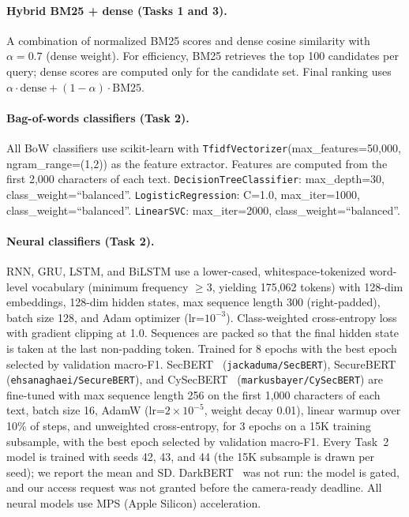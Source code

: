\documentclass{article}
\begin{document}
\paragraph{Hybrid BM25 + dense (Tasks 1 and 3).}
A combination of normalized BM25 scores and dense cosine similarity with $\alpha{=}0.7$ (dense weight). For efficiency, BM25 retrieves the top 100 candidates per query; dense scores are computed only for the candidate set. Final ranking uses $\alpha \cdot \text{dense} + (1{-}\alpha) \cdot \text{BM25}$.

\paragraph{Bag-of-words classifiers (Task 2).}
All BoW classifiers use scikit-learn with \texttt{TfidfVectorizer}(max\_features=50{,}000, ngram\_range=(1,2)) as the feature extractor. Features are computed from the first 2{,}000 characters of each text. \texttt{DecisionTreeClassifier}: max\_depth=30, class\_weight=``balanced''. \texttt{LogisticRegression}: C=1.0, max\_iter=1000, class\_weight=``balanced''. \texttt{LinearSVC}: max\_iter=2000, class\_weight=``balanced''.

\paragraph{Neural classifiers (Task 2).}
RNN, GRU, LSTM, and BiLSTM use a lower-cased, whitespace-tokenized word-level vocabulary (minimum frequency $\geq$3, yielding 175,062 tokens) with 128-dim embeddings, 128-dim hidden states, max sequence length 300 (right-padded), batch size 128, and Adam optimizer (lr=$10^{-3}$). Class-weighted cross-entropy loss with gradient clipping at 1.0. Sequences are packed so that the final hidden state is taken at the last non-padding token. Trained for 8 epochs with the best epoch selected by validation macro-F1. SecBERT~\citep{secbert2022} (\texttt{jackaduma/SecBERT}), SecureBERT~\citep{aghaei2023securebert} (\texttt{ehsanaghaei/SecureBERT}), and CySecBERT~\citep{bayer2024cysecbert} (\texttt{markusbayer/CySecBERT}) are fine-tuned with max sequence length 256 on the first 1{,}000 characters of each text, batch size 16, AdamW (lr=$2{\times}10^{-5}$, weight decay 0.01), linear warmup over 10\% of steps, and unweighted cross-entropy, for 3 epochs on a 15K training subsample, with the best epoch selected by validation macro-F1. Every Task~2 model is trained with seeds 42, 43, and 44 (the 15K subsample is drawn per seed); we report the mean and SD. DarkBERT~\citep{jin2023darkbert} was not run: the model is gated, and our access request was not granted before the camera-ready deadline. All neural models use MPS (Apple Silicon) acceleration.
\end{document}
